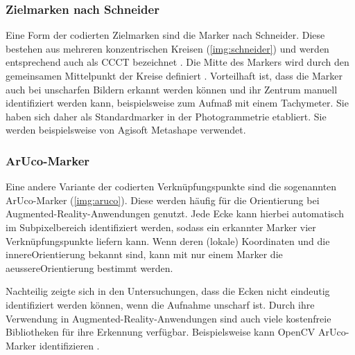 \documentclass[./00PhotoBox.tex]{subfiles}
\begin{document}
\subsubsection{Zielmarken nach Schneider}
Eine Form der codierten Zielmarken sind die Marker nach Schneider. Diese bestehen aus mehreren konzentrischen Kreisen (\autoref{img:schneider}) und werden entsprechend auch als \Gls{CCCT} bezeichnet \citep{ccct}. Die Mitte des Markers wird durch den gemeinsamen Mittelpunkt der Kreise definiert \citep{schneider}. Vorteilhaft ist, dass die Marker auch bei unscharfen Bildern erkannt werden können und ihr Zentrum manuell identifiziert werden kann, beispielsweise zum Aufmaß mit einem Tachymeter. Sie haben sich daher als Standardmarker in der Photogrammetrie etabliert. Sie werden beispielsweise von Agisoft Metashape verwendet.


\subsubsection{ArUco-Marker}
Eine andere Variante der codierten Verknüpfungspunkte sind die sogenannten ArUco-Marker (\autoref{img:aruco}). Diese werden häufig für die Orientierung bei Augmented-Reality-An\-wend\-ungen genutzt. Jede Ecke kann hierbei automatisch im Subpixelbereich identifiziert werden, sodass ein erkannter Marker vier Verknüpfungspunkte liefern kann. Wenn deren (lokale) Koordinaten und die \gls{innereOrientierung} bekannt sind, kann mit nur einem Marker die \gls{aeussereOrientierung} bestimmt werden. \citep[S. 545]{luhmann}

Nachteilig zeigte sich in den Untersuchungen, dass die Ecken nicht eindeutig identifiziert werden können, wenn die Aufnahme unscharf ist. Durch ihre Verwendung in Augmented-Reality-Anwendungen sind auch viele kostenfreie Bibliotheken für ihre Erkennung verfügbar. Beispielsweise kann OpenCV ArUco-Marker identifizieren \citep{opencv}.
\end{document}
